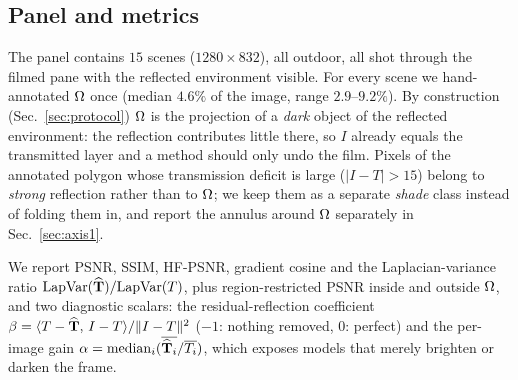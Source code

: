 \subsection{Panel and metrics}
\label{sec:panel}

The panel contains $15$ scenes ($1280{\times}832$), all outdoor, all shot through the filmed pane
with the reflected environment visible. For every scene we hand-annotated $\Omega$ once (median $4.6\%$
of the image, range $2.9$--$9.2\%$). By construction (Sec.~\ref{sec:protocol}) $\Omega$ is the
projection of a \emph{dark} object of the reflected environment: the reflection contributes little
there, so $I$ already equals the transmitted layer and a method should only undo the film. Pixels of
the annotated polygon whose transmission deficit is large ($|I-T|>15$) belong to \emph{strong}
reflection rather than to $\Omega$; we keep them as a separate \emph{shade} class instead of folding
them in, and report the annulus around $\Omega$ separately in Sec.~\ref{sec:axis1}.

We report PSNR, SSIM, HF-PSNR, gradient cosine and the Laplacian-variance ratio
$\mathrm{LapVar}(\widehat{\mathbf{T}})/\mathrm{LapVar}(T)$, plus region-restricted PSNR inside and outside
$\Omega$, and two diagnostic scalars: the residual-reflection coefficient
$\beta=\langle T-\widehat{\mathbf{T}},\,I-T\rangle/\lVert I-T\rVert^2$ ($-1$: nothing removed, $0$:
perfect) and the per-image gain
$\alpha=\mathrm{median}_i(\overline{\widehat{\mathbf{T}}_i}/\overline{T_i})$, which exposes models that
merely brighten or darken the frame.
